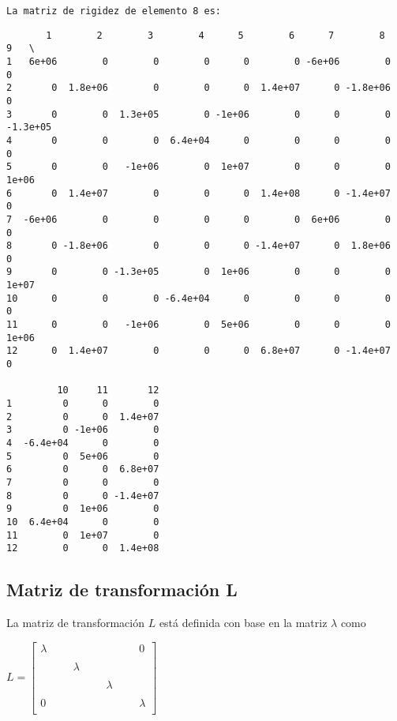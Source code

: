 \documentclass{article}
\begin{document}
    \begin{Verbatim}[commandchars=\\\{\}]
La matriz de rigidez de elemento 8 es:
    \end{Verbatim}

    
    \begin{verbatim}
       1        2        3        4      5        6      7        8        9   \
1   6e+06        0        0        0      0        0 -6e+06        0        0   
2       0  1.8e+06        0        0      0  1.4e+07      0 -1.8e+06        0   
3       0        0  1.3e+05        0 -1e+06        0      0        0 -1.3e+05   
4       0        0        0  6.4e+04      0        0      0        0        0   
5       0        0   -1e+06        0  1e+07        0      0        0    1e+06   
6       0  1.4e+07        0        0      0  1.4e+08      0 -1.4e+07        0   
7  -6e+06        0        0        0      0        0  6e+06        0        0   
8       0 -1.8e+06        0        0      0 -1.4e+07      0  1.8e+06        0   
9       0        0 -1.3e+05        0  1e+06        0      0        0    1e+07   
10      0        0        0 -6.4e+04      0        0      0        0        0   
11      0        0   -1e+06        0  5e+06        0      0        0    1e+06   
12      0  1.4e+07        0        0      0  6.8e+07      0 -1.4e+07        0   

         10     11       12  
1         0      0        0  
2         0      0  1.4e+07  
3         0 -1e+06        0  
4  -6.4e+04      0        0  
5         0  5e+06        0  
6         0      0  6.8e+07  
7         0      0        0  
8         0      0 -1.4e+07  
9         0  1e+06        0  
10  6.4e+04      0        0  
11        0  1e+07        0  
12        0      0  1.4e+08  
    \end{verbatim}

    
    \subsection{Matriz de transformación
L}\label{matriz-de-transformaciuxf3n-l}

La matriz de transformación $L$ está definida con base en la matriz
$\lambda$ como

$L = \left[\begin{matrix} \lambda  &  &  &  &  &  &  &  &  & 0 \\ & & & & & & & & & \\ & & & \lambda & & & & & & \\ & & & & & & & & & \\ & & & & & & \lambda& & & \\ & & & & & & & & & \\ 0 & & & & & & & & & \lambda \\  \end{matrix}\right]$
\end{document}
